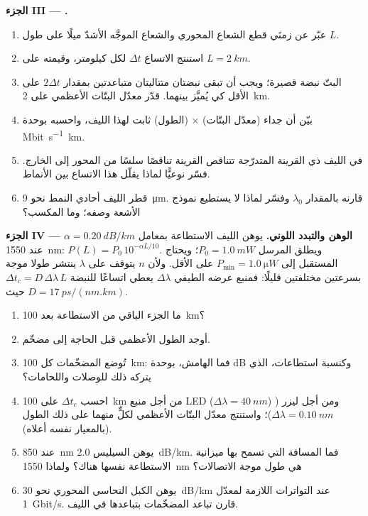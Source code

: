 \begin{problem}
\medskip
\noindent\textbf{الجزء III --- .}
\begin{enumerate}[resume]
  \item عبّر عن زمنَي قطع الشعاع المحوري والشعاع الموجَّه الأشدّ
        ميلًا على طول $L$.
  \item استنتج الاتساع $\Delta t$ لكل كيلومتر، وقيمته على
        $L = \qty{2}{km}$.
  \item البتّ نبضة قصيرة؛ ويجب أن تبقى نبضتان متتاليتان
        متباعدتين بمقدار $2\Delta t$ على الأقل كي يُميَّز بينهما. قدّر
        معدّل البتّات الأعظمي على \qty{2}{km}.
  \item بيّن أن جداء (معدّل البتّات) $\times$ (الطول) ثابت
        لهذا الليف، واحسبه بوحدة \unit{Mbit.s^{-1}.km}.
  \item في الليف ذي القرينة المتدرّجة تتناقص القرينة تناقصًا سلسًا من
        المحور إلى الخارج. فسّر نوعيًّا لماذا يقلّل هذا الاتساع
        بين الأنماط.
  \item قطر  الليف أحادي النمط نحو \qty{9}{\micro m}.
        قارنه بالمقدار $\lambda_0$ وفسّر لماذا لا يستطيع نموذج الأشعة
        وصفه؛ وما المكسب؟
\end{enumerate}

\medskip
\noindent\textbf{الجزء IV --- الوهن والتبدد اللوني.}
يوهن الليف الاستطاعة بمعامل $\alpha = \qty{0.20}{dB/km}$ عند
\qty{1550}{nm}: $P(L) = P_0\,10^{-\alpha L/10}$. ويطلق المرسل
$P_0 = \qty{1.0}{mW}$؛ ويحتاج المستقبل إلى
$P_{\min} = \qty{1.0}{\micro W}$ على الأقل. ولأن $n$ يتوقف على $\lambda$
ينتشر طولا موجة بسرعتين مختلفتين قليلًا: فمنبع عرضه الطيفي
$\Delta\lambda$ يعطي اتساعًا للنبضة $\Delta t_c = D\,\Delta\lambda\,L$
حيث $D = \qty{17}{ps/(nm.km)}$.
\begin{enumerate}[resume]
  \item ما الجزء الباقي من الاستطاعة بعد \qty{100}{km}؟
  \item أوجد الطول الأعظمي قبل الحاجة إلى مضخّم.
  \item تُوضع المضخّمات كل \qty{100}{km}: فما الهامش، بوحدة dB
        وكنسبة استطاعات، الذي يتركه ذلك للوصلات واللحامات؟
  \item احسب $\Delta t_c$ على \qty{100}{km} من أجل منبع LED
        ($\Delta\lambda = \qty{40}{nm}$) ومن أجل ليزر
        ($\Delta\lambda = \qty{0.10}{nm}$)؛ واستنتج معدّل البتّات
        الأعظمي لكلٍّ منهما على ذلك الطول (بالمعيار نفسه أعلاه).
  \item عند \qty{850}{nm} يوهن السيليس \qty{2.0}{dB/km}. فما
        المسافة التي تسمح بها ميزانية الاستطاعة نفسها هناك؟ ولماذا
        \qty{1550}{nm} هي طول موجة الاتصالات؟
  \item يوهن الكبل النحاسي المحوري نحو \qty{30}{dB/km} عند
        التواترات اللازمة لمعدّل \qty{1}{Gbit/s}. قارن تباعد
        المضخّمات بتباعدها في الليف.
\end{enumerate}


\end{problem}
